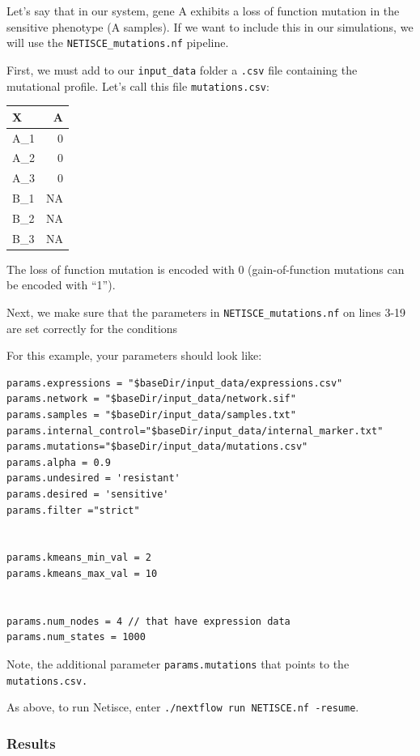 \documentclass[
]{book}
\theoremstyle{definition}
\theoremstyle{definition}
\theoremstyle{definition}
\theoremstyle{definition}
\theoremstyle{remark}
\begin{document}
Let's say that in our system, gene A exhibits a loss of function mutation in the sensitive phenotype (A samples). If we want to include this in our simulations, we will use the \texttt{NETISCE\_mutations.nf} pipeline.

First, we must add to our \texttt{input\_data} folder a \texttt{.csv} file containing the mutational profile. Let's call this file \texttt{mutations.csv}:

\begin{tabular}{l|r}
\hline
X & A\\
\hline
A\_1 & 0\\
\hline
A\_2 & 0\\
\hline
A\_3 & 0\\
\hline
B\_1 & NA\\
\hline
B\_2 & NA\\
\hline
B\_3 & NA\\
\hline
\end{tabular}

The loss of function mutation is encoded with 0 (gain-of-function mutations can be encoded with ``1'').

Next, we make sure that the parameters in \texttt{NETISCE\_mutations.nf} on lines 3-19 are set correctly for the conditions

For this example, your parameters should look like:

\begin{verbatim}
params.expressions = "$baseDir/input_data/expressions.csv"
params.network = "$baseDir/input_data/network.sif"
params.samples = "$baseDir/input_data/samples.txt"
params.internal_control="$baseDir/input_data/internal_marker.txt"
params.mutations="$baseDir/input_data/mutations.csv"
params.alpha = 0.9
params.undesired = 'resistant'
params.desired = 'sensitive'
params.filter ="strict"


params.kmeans_min_val = 2
params.kmeans_max_val = 10


params.num_nodes = 4 // that have expression data
params.num_states = 1000
\end{verbatim}

Note, the additional parameter \texttt{params.mutations} that points to the \texttt{mutations.csv.}

As above, to run Netisce, enter \texttt{./nextflow\ run\ NETISCE.nf\ -resume}.

\hypertarget{section-id}{%
\subsubsection*{Results}\label{section-id}}
\end{document}
